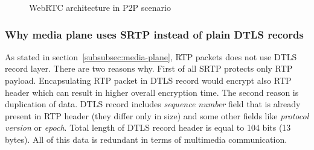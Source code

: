 \begin{figure}
    \centering
    \caption{WebRTC architecture in P2P scenario}
    \label{fig:webrtc-architecture}
\end{figure}

\FloatBarrier

\subsubsection{Why media plane uses SRTP instead of plain DTLS records}
As stated in section~\ref{subsubsec:media-plane}, RTP packets does not use DTLS record layer.
There are two reasons why.
First of all SRTP protects only RTP payload.
Encapsulating RTP packet in DTLS record would encrypt also RTP header which can result in higher overall encryption time.
The second reason is duplication of data.
DTLS record includes \textit{sequence number} field that is already present in RTP header (they differ only in size)
and some other fields like \textit{protocol version} or \textit{epoch}.
Total length of DTLS record header is equal to 104 bits (13 bytes).
All of this data is redundant in terms of multimedia communication.

